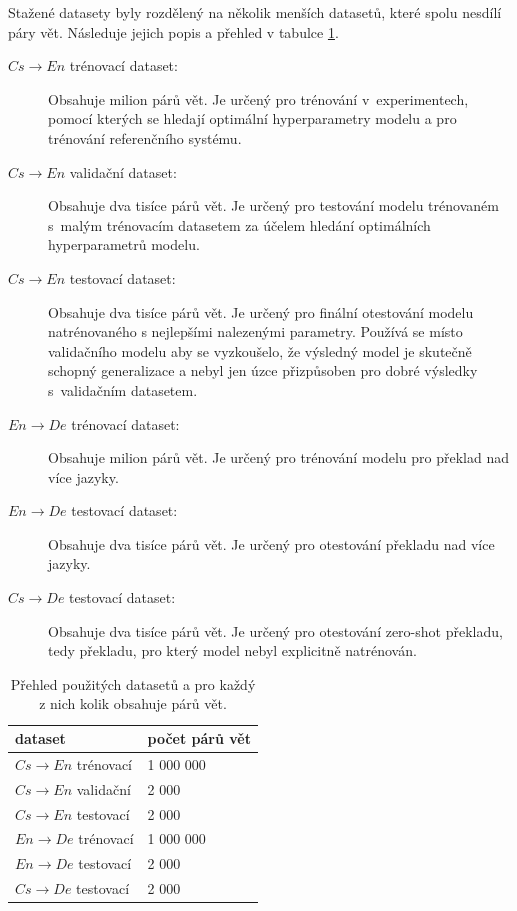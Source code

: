 Stažené datasety byly rozdělený na několik menších datasetů, které spolu nesdílí páry vět. Následuje jejich popis a přehled v tabulce \ref{table:datasets}.
\begin{description}
  \item[$Cs\rightarrow En$ trénovací dataset:] Obsahuje milion párů vět. Je určený pro trénování v~experimentech, pomocí kterých se hledají optimální hyperparametry modelu a pro trénování referenčního systému.
  \item[$Cs\rightarrow En$ validační dataset:] Obsahuje dva tisíce párů vět. Je určený pro testování modelu trénovaném s~malým trénovacím datasetem za účelem hledání optimálních hyperparametrů modelu.
  \item[$Cs\rightarrow En$ testovací dataset:] Obsahuje dva tisíce párů vět. Je určený pro finální otestování modelu natrénovaného s nejlepšími nalezenými parametry. Používá se místo validačního modelu aby se vyzkoušelo, že výsledný model je skutečně schopný generalizace a nebyl jen úzce přizpůsoben pro dobré výsledky s~validačním datasetem.
  \item[$En\rightarrow De$ trénovací dataset:] Obsahuje milion párů vět. Je určený pro trénování modelu pro překlad nad více jazyky.
  \item[$En\rightarrow De$ testovací dataset:] Obsahuje dva tisíce párů vět. Je určený pro otestování překladu nad více jazyky.
  \item[$Cs\rightarrow De$ testovací dataset:] Obsahuje dva tisíce párů vět. Je určený pro otestování zero-shot překladu, tedy překladu, pro který model nebyl explicitně natrénován.
\end{description}

\begin{table}[H]
    \begin{center}
        \begin{tabular}{ll}
          \toprule
          dataset & počet párů vět  \\
          \midrule
          $Cs\rightarrow En$ trénovací & 1 000 000 \\
          $Cs\rightarrow En$ validační & 2 000 \\
          $Cs\rightarrow En$ testovací & 2 000 \\
          $En\rightarrow De$ trénovací & 1 000 000 \\
          $En\rightarrow De$ testovací & 2 000 \\
          $Cs\rightarrow De$ testovací & 2 000 \\
          \bottomrule
        \end{tabular}
    \end{center}
	\caption{Přehled použitých datasetů a pro každý z nich kolik obsahuje párů vět.}
	\label{table:datasets}
\end{table}

